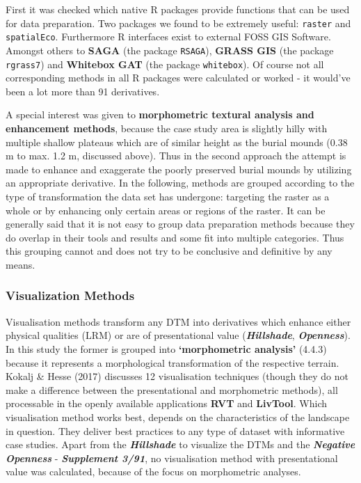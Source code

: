 \documentclass[
  12pt,
]{article}
\begin{document}
First it was checked which native R packages provide functions that can be used for data preparation. Two packages we found to be extremely useful: \texttt{raster} and \texttt{spatialEco}. Furthermore R interfaces exist to external FOSS GIS Software. Amongst others to \textbf{SAGA} (the package \texttt{RSAGA}), \textbf{GRASS GIS} (the package \texttt{rgrass7}) and \textbf{Whitebox GAT} (the package \texttt{whitebox}). Of course not all corresponding methods in all R packages were calculated or worked - it would've been a lot more than 91 derivatives.

A special interest was given to \textbf{morphometric textural analysis and enhancement methods}, because the case study area is slightly hilly with multiple shallow plateaus which are of similar height as the burial mounds (0.38 m to max. 1.2 m, discussed above). Thus in the second approach the attempt is made to enhance and exaggerate the poorly preserved burial mounds by utilizing an appropriate derivative.
In the following, methods are grouped according to the type of transformation the data set has undergone: targeting the raster as a whole or by enhancing only certain areas or regions of the raster. It can be generally said that it is not easy to group data preparation methods because they do overlap in their tools and results and some fit into multiple categories. Thus this grouping cannot and does not try to be conclusive and definitive by any means.

\hypertarget{visualization-methods}{%
\subsubsection{\texorpdfstring{\textbf{Visualization Methods}}{Visualization Methods}}\label{visualization-methods}}

Visualisation methods transform any DTM into derivatives which enhance either physical qualities (LRM) or are of presentational value (\textbf{\emph{Hillshade}}, \textbf{\emph{Openness}}). In this study the former is grouped into \textbf{`morphometric analysis'} (4.4.3) because it represents a morphological transformation of the respective terrain.
Kokalj \& Hesse (2017) discusses 12 visualisation techniques (though they do not make a difference between the presentational and morphometric methods), all processable in the openly available applications \textbf{RVT} and \textbf{LivTool}. Which visualisation method works best, depends on the characteristics of the landscape in question. They deliver best practices to any type of dataset with informative case studies. Apart from the \textbf{\emph{Hillshade}} to visualize the DTMs and the \textbf{\emph{Negative Openness}} - \textbf{\emph{Supplement 3/91}}, no visualisation method with presentational value was calculated, because of the focus on morphometric analyses.
\end{document}
